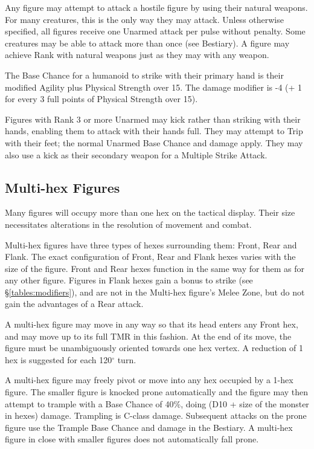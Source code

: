 \begin{multicols*}{3}
Any figure may attempt to attack a hostile figure by using their
natural weapons. For many creatures, this is the only way they may
attack. Unless otherwise specified, all figures receive one Unarmed
attack per pulse without penalty. Some creatures may be able to attack
more than once (see Bestiary). A figure may achieve Rank with natural
weapons just as they may with any weapon.

The Base Chance for a humanoid to strike with their primary hand is
their modified Agility  plus Physical Strength over 15. The damage
modifier is -4 (+ 1 for every 3 full points of Physical Strength over
15).

Figures with Rank 3 or more Unarmed may kick rather than striking with
their hands, enabling them to attack with their hands full. They may
attempt to Trip with their feet; the normal Unarmed Base Chance and
damage apply. They may also use a kick as their secondary weapon for a
Multiple Strike Attack.

\subsection{Multi-hex Figures}

Many figures will occupy more than one hex on the tactical
display. Their size necessitates alterations in the resolution of
movement and combat.

Multi-hex figures have three types of hexes surrounding them: Front,
Rear and Flank. The exact configuration of Front, Rear and Flank hexes
varies with the size of the figure. Front and Rear hexes function in
the same way for them as for any other figure. Figures in Flank hexes
gain a bonus to strike (see \S \ref{tables:modifiers}), and are not in
the Multi-hex figure's Melee Zone, but do not gain the advantages of a
Rear attack.

A multi-hex figure may move in any way so that its head enters any
Front hex, and may move up to its full TMR in this fashion. At the end
of its move, the figure must be unambiguously oriented towards one hex
vertex. A reduction of 1 hex is suggested for each 120$^\circ$ turn.

A multi-hex figure may freely pivot or move into any hex occupied by a
1-hex figure. The smaller figure is knocked prone automatically and
the figure may then attempt to trample with a Base Chance of 40\%,
doing (D10 + size of the monster in hexes) damage. Trampling is
C-class damage. Subsequent attacks on the prone figure use the Trample
Base Chance and damage in the Bestiary. A multi-hex figure in close
with smaller figures does not automatically fall prone.


\end{multicols*}
